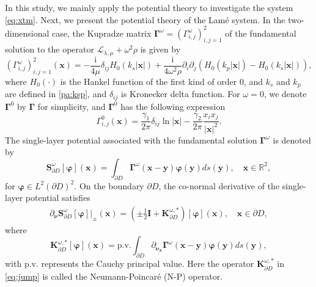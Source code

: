 \documentclass[11pt,reqno,twoside]{amsart}
\theoremstyle{definition}
\theoremstyle{remark}
\numberwithin{equation}{section}
\newcommand{\bvarphi}{\bm{\varphi}}
\newcommand{\bnu}{\bm{\nu}}
\newcommand{\bGa}{\mathbf{\Gamma}}
\newcommand{\bx}{\mathbf{x}}
\newcommand{\by}{\mathbf{y}}
\newcommand{\bS}{\mathbf{S}}
\newcommand{\bK}{\mathbf{K}}
\newcommand{\bI}{\mathbf{I}}
\newcommand{\Lcal}{\mathcal{L}}
\begin{document}
In this study, we mainly apply the potential theory to investigate the system \eqref{eq:xtm}. Next, we present the potential theory of the Lam\'e system.
In the two-dimensional case, the Kupradze matrix $\bGa^{\omega}=(\Gamma^{\omega}_{i,j})_{i,j=1}^2$ of the fundamental solution to the operator $\Lcal_{\lambda,\mu} + \omega^2\rho$  is given by \cite{ABG}
\begin{displaymath}
	(\Gamma^{\omega}_{i,j})_{i,j=1}^2(\bx)=-\frac{\mathrm{i}}{4\mu}\delta_{ij} H_0\left(k_s|\bx|\right)+\frac{\mathrm{i}}{4\omega^2\rho}\partial_i\partial_j\left(H_0\left(k_p|\bx|\right)-H_0\left(k_s|\bx|\right)\right),
\end{displaymath}
where $H_{0}\left(\cdot\right)$ is the Hankel function of the first kind of order 0, and $k_s$ and $k_p$ are defined in \eqref{pa:ksp}, and $\delta_{ij}$ is Kronecker delta function. For $\omega=0$, we denote  $\bGa^{0}$ by  $\bGa$ for simplicity, and $\bGa^{0}$ has the following expression
\[\Gamma^{0}_{i,j} (\bx) = \frac{\gamma_1}{2\pi}\delta_{ij}\ln|\bx|-\frac{\gamma_2}{2\pi}\frac{x_ix_j}{|\bx|^2}. \]
The single-layer potential associated with the fundamental solution $\bGa^{\omega}$ is denoted by
\begin{displaymath}\label{eq:single}
	\bS_{\partial D}^{\omega}[\bvarphi](\bx)=\int_{\partial D} \bGa^{\omega}(\bx-\by)\bvarphi(\by)ds(\by), \quad \bx\in\mathbb{R}^2,
\end{displaymath}
for $\bvarphi\in L^2(\partial D)^2$. On the boundary $\partial D$, the co-normal derivative of the single-layer potential satisfies
\begin{align}\label{eq:jump}
	\partial_{\bnu}   \bS_{\partial D}^{\omega}[\bvarphi]|_{\pm}(\bx)=\left( \pm\frac{1}{2}\bI +  \bK_{\partial D}^{\omega, *} \right)[\bvarphi](\bx), \quad \bx\in\partial D,
\end{align}
where
\[\bK_{\partial D}^{\omega, *} [\bvarphi](\bx)=\mbox{p.v.} \int_{\partial D} \partial_{\bnu_{\bx}} \bGa^{\omega}(\bx-\by)\bvarphi(\by)ds(\by),\]
with $\mbox{p.v.}$ represents the Cauchy principal value. Here the operator $\bK_{\partial D}^{\omega, *}$ in \eqref{eq:jump} is called the Neumann-Poincar\'e (N-P) operator. 
\end{document}
